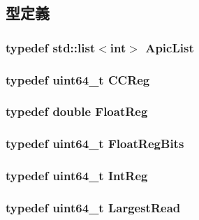 \subsection{型定義}
\hypertarget{namespaceX86ISA_a25e7a37aec0875a2333d311783729d23}{
\subsubsection[{ApicList}]{\setlength{\rightskip}{0pt plus 5cm}typedef {\bf std::list}$<$int$>$ {\bf ApicList}}}
\label{namespaceX86ISA_a25e7a37aec0875a2333d311783729d23}
\hypertarget{namespaceX86ISA_aaefa29979e267ea80ed6b82756284354}{
\subsubsection[{CCReg}]{\setlength{\rightskip}{0pt plus 5cm}typedef uint64\_\-t {\bf CCReg}}}
\label{namespaceX86ISA_aaefa29979e267ea80ed6b82756284354}
\hypertarget{namespaceX86ISA_a06fae4f187c7c94b8b0046dd6802be48}{
\subsubsection[{FloatReg}]{\setlength{\rightskip}{0pt plus 5cm}typedef double {\bf FloatReg}}}
\label{namespaceX86ISA_a06fae4f187c7c94b8b0046dd6802be48}
\hypertarget{namespaceX86ISA_a6905e424d12491fe126e1a22a9c8d655}{
\subsubsection[{FloatRegBits}]{\setlength{\rightskip}{0pt plus 5cm}typedef uint64\_\-t {\bf FloatRegBits}}}
\label{namespaceX86ISA_a6905e424d12491fe126e1a22a9c8d655}
\hypertarget{namespaceX86ISA_a0e080577527fb3e9685399f75b5caf15}{
\subsubsection[{IntReg}]{\setlength{\rightskip}{0pt plus 5cm}typedef uint64\_\-t {\bf IntReg}}}
\label{namespaceX86ISA_a0e080577527fb3e9685399f75b5caf15}
\hypertarget{namespaceX86ISA_a13e8c318dd29afdaf79751a072344db8}{
\subsubsection[{LargestRead}]{\setlength{\rightskip}{0pt plus 5cm}typedef uint64\_\-t {\bf LargestRead}}}
